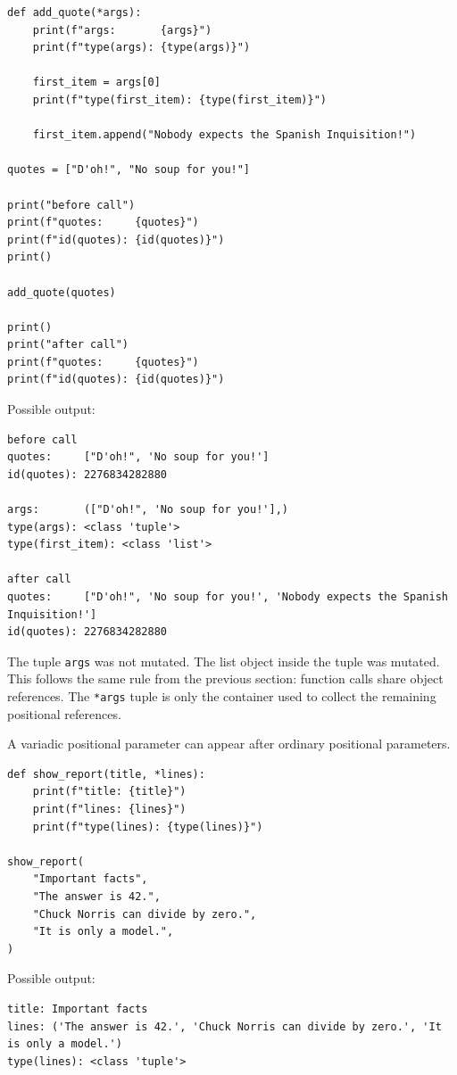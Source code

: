 \begin{verbatim}
def add_quote(*args):
    print(f"args:       {args}")
    print(f"type(args): {type(args)}")

    first_item = args[0]
    print(f"type(first_item): {type(first_item)}")

    first_item.append("Nobody expects the Spanish Inquisition!")

quotes = ["D'oh!", "No soup for you!"]

print("before call")
print(f"quotes:     {quotes}")
print(f"id(quotes): {id(quotes)}")
print()

add_quote(quotes)

print()
print("after call")
print(f"quotes:     {quotes}")
print(f"id(quotes): {id(quotes)}")
\end{verbatim}

Possible output:

\begin{verbatim}
before call
quotes:     ["D'oh!", 'No soup for you!']
id(quotes): 2276834282880

args:       (["D'oh!", 'No soup for you!'],)
type(args): <class 'tuple'>
type(first_item): <class 'list'>

after call
quotes:     ["D'oh!", 'No soup for you!', 'Nobody expects the Spanish Inquisition!']
id(quotes): 2276834282880
\end{verbatim}

The tuple \texttt{args} was not mutated. The list object inside the tuple was mutated. This follows the same rule from the previous section: function calls share object references. The \texttt{*args} tuple is only the container used to collect the remaining positional references.

A variadic positional parameter can appear after ordinary positional parameters.

\begin{verbatim}
def show_report(title, *lines):
    print(f"title: {title}")
    print(f"lines: {lines}")
    print(f"type(lines): {type(lines)}")

show_report(
    "Important facts",
    "The answer is 42.",
    "Chuck Norris can divide by zero.",
    "It is only a model.",
)
\end{verbatim}

Possible output:

\begin{verbatim}
title: Important facts
lines: ('The answer is 42.', 'Chuck Norris can divide by zero.', 'It is only a model.')
type(lines): <class 'tuple'>
\end{verbatim}

